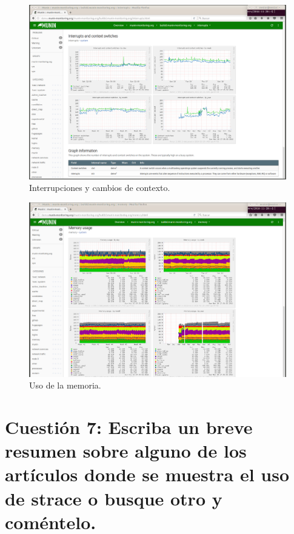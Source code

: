\documentclass[a4paper,titlepage,12pt]{scrartcl}	%
\numberwithin{figure}{section} %
\numberwithin{table}{section} %
\begin{document}
	\begin{figure}[H]
		\centering
		\includegraphics[scale=0.27]{./Imagenes/6-4.png}
		\caption[Interrupciones y cambios de contexto.]{Interrupciones y cambios de contexto.}
		\label{6-4}
	\end{figure}
	
	\begin{figure}[H]
		\centering
		\includegraphics[scale=0.27]{./Imagenes/6-5.png}
		\caption[Uso de la memoria.]{Uso de la memoria.}
		\label{6-5}
	\end{figure}
	
	\section[Cuestión 7: Escriba un breve resumen sobre alguno de los artículos donde se muestra el uso de strace o busque otro y coméntelo.]{Cuestión 7: Escriba un breve resumen sobre alguno de los artículos donde se muestra el uso de strace o busque otro y coméntelo.}
	
\end{document}
